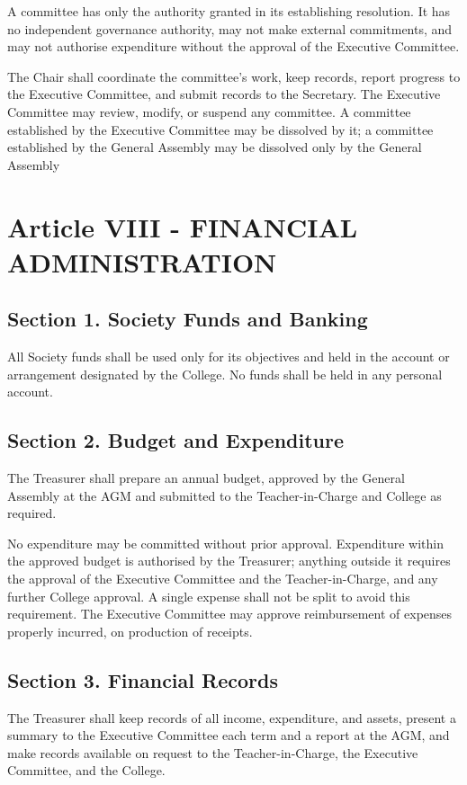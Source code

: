 \documentclass[a4paper]{article}
\begin{document}
A committee has only the authority granted in its establishing resolution. It has no
independent governance authority, may not make external commitments, and may not
authorise expenditure without the approval of the Executive Committee.

The Chair shall coordinate the committee's work, keep records, report progress to the
Executive Committee, and submit records to the Secretary. The Executive Committee may
review, modify, or suspend any committee. A committee established by the Executive
Committee may be dissolved by it; a committee established by the General Assembly may be
dissolved only by the General Assembly

\section*{Article VIII - FINANCIAL ADMINISTRATION}

\subsection*{Section 1. Society Funds and Banking}

All Society funds shall be used only for its objectives and held in the account or
arrangement designated by the College. No funds shall be held in any personal account.

\subsection*{Section 2. Budget and Expenditure}
The Treasurer shall prepare an annual budget, approved by the General Assembly at the
AGM and submitted to the Teacher-in-Charge and College as required.

No expenditure may be committed without prior approval. Expenditure within the approved
budget is authorised by the Treasurer; anything outside it requires the approval of the
Executive Committee and the Teacher-in-Charge, and any further College approval. A single
expense shall not be split to avoid this requirement. The Executive Committee may
approve reimbursement of expenses properly incurred, on production of receipts.

\subsection*{Section 3. Financial Records}
The Treasurer shall keep records of all income, expenditure, and assets, present a
summary to the Executive Committee each term and a report at the AGM, and make records
available on request to the Teacher-in-Charge, the Executive Committee, and the College.
\end{document}
